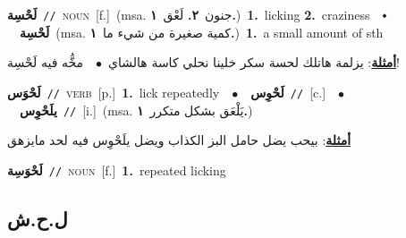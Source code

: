 \documentclass[10pt,a4paper,twoside]{article} %
\begin{document}
\begin{multicols}{2}
{\setlength\topsep{0pt}\textbf{\foreignlanguage{arabic}{لَحْسِة}}\ {\color{gray}\texttt{//}\color{black}}\ \textsc{noun}\ [f.]\ \color{gray}(msa. \foreignlanguage{arabic}{جنون}~\foreignlanguage{arabic}{\textbf{٢.}}  \foreignlanguage{arabic}{لَعْق}~\foreignlanguage{arabic}{\textbf{١.}})\color{black}\ \textbf{1.}~licking  \textbf{2.}~craziness\ \ $\smblkdiamond$\ \ \setlength\topsep{0pt}\textbf{\foreignlanguage{arabic}{لَحْسِة}}\ \color{gray}(msa. \foreignlanguage{arabic}{كمية صغيرة من شيء ما}~\foreignlanguage{arabic}{\textbf{١.}})\color{black}\ \textbf{1.}~a small amount of sth\  \begin{flushright}\color{gray}\foreignlanguage{arabic}{\textbf{\underline{\foreignlanguage{arabic}{أمثلة}}}: يزلمة هاتلك لحسة سكر خلينا نحلي كاسة هالشاي\ $\bullet$\ \  مخُّه فيه لَحْسِة!}\end{flushright}\color{black}} \vspace{2mm}

{\setlength\topsep{0pt}\textbf{\foreignlanguage{arabic}{لَحْوَس}}\ {\color{gray}\texttt{//}\color{black}}\ \textsc{verb}\ [p.]\ \textbf{1.}~lick repeatedly\ \ $\bullet$\ \ \setlength\topsep{0pt}\textbf{\foreignlanguage{arabic}{لَحْوِس}}\ {\color{gray}\texttt{//}\color{black}}\ [c.]\ \ $\bullet$\ \ \setlength\topsep{0pt}\textbf{\foreignlanguage{arabic}{يلَحْوِس}}\ {\color{gray}\texttt{//}\color{black}}\ [i.]\ \color{gray}(msa. \foreignlanguage{arabic}{يَلْعَق بشكل متكرر}~\foreignlanguage{arabic}{\textbf{١.}})\color{black}\  \begin{flushright}\color{gray}\foreignlanguage{arabic}{\textbf{\underline{\foreignlanguage{arabic}{أمثلة}}}: بيحب يضل حامل البز الكذاب ويضل يلَحْوِس فيه لحد مايزهق}\end{flushright}\color{black}} \vspace{2mm}

{\setlength\topsep{0pt}\textbf{\foreignlanguage{arabic}{لَحْوَسِة}}\ {\color{gray}\texttt{//}\color{black}}\ \textsc{noun}\ [f.]\ \textbf{1.}~repeated licking\ } \vspace{2mm}

\vspace{-3mm}
\subsection*{\color{blue}\foreignlanguage{arabic}{ل.ح.ش}\color{blue}{}} 


\end{multicols}
\end{document}
